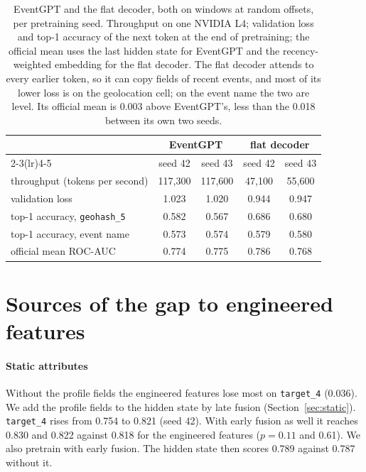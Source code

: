 \documentclass[12pt]{article}
\newcommand{\tok}[1]{\texttt{#1}}
\begin{document}
\begin{table}[htbp]
\centering
\caption{EventGPT and the flat decoder, both on windows at random offsets, per pretraining seed. Throughput on one NVIDIA L4; validation loss and top-1 accuracy of the next token at the end of pretraining; the official mean uses the last hidden state for EventGPT and the recency-weighted embedding for the flat decoder. The flat decoder attends to every earlier token, so it can copy fields of recent events, and most of its lower loss is on the geolocation cell; on the event name the two are level. Its official mean is 0.003 above EventGPT's, less than the 0.018 between its own two seeds.}
\label{tab:flat}
\begin{tabular}{lcccc}
\toprule
 & \multicolumn{2}{c}{EventGPT} & \multicolumn{2}{c}{flat decoder} \\
\cmidrule(lr){2-3}\cmidrule(lr){4-5}
 & seed 42 & seed 43 & seed 42 & seed 43 \\
\midrule
throughput (tokens per second) & 117,300 & 117,600 & 47,100 & 55,600 \\
validation loss & 1.023 & 1.020 & 0.944 & 0.947 \\
top-1 accuracy, \tok{geohash\_5} & 0.582 & 0.567 & 0.686 & 0.680 \\
top-1 accuracy, event name & 0.573 & 0.574 & 0.579 & 0.580 \\
official mean ROC-AUC & 0.774 & 0.775 & 0.786 & 0.768 \\
\bottomrule
\end{tabular}
\end{table}

\section{Sources of the gap to engineered features}\label{app:gap}

\paragraph{Static attributes} Without the profile fields the engineered features lose most on \tok{target\_4} (0.036). We add the profile fields to the hidden state by late fusion (Section~\ref{sec:static}). \tok{target\_4} rises from 0.754 to 0.821 (seed 42). With early fusion as well it reaches 0.830 and 0.822 against 0.818 for the engineered features ($p = 0.11$ and 0.61). We also pretrain with early fusion. The hidden state then scores 0.789 against 0.787 without it.
\end{document}
